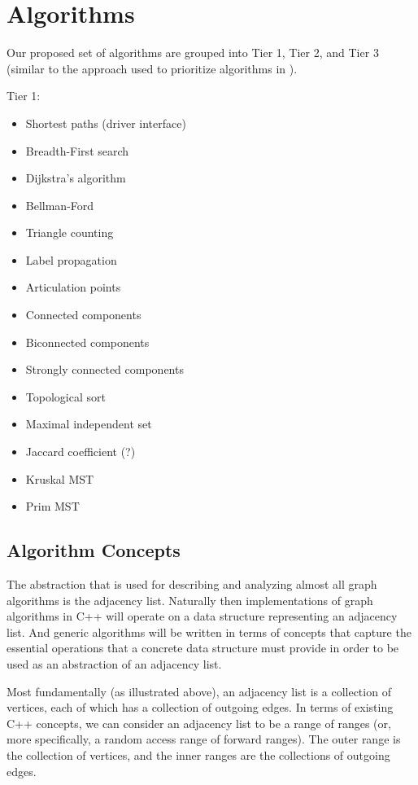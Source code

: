 \chapter{Algorithms}

Our proposed set of algorithms are grouped into Tier 1, Tier 2, and Tier 3 (similar to the approach used to prioritize algorithms in ).

Tier 1:
\begin{itemize}
\item Shortest paths (driver interface)
\item Breadth-First search
\item Dijkstra's algorithm
\item Bellman-Ford
\item Triangle counting
\item Label propagation
\item Articulation points
\item Connected components
\item Biconnected components
\item Strongly connected components  
\item Topological sort
\item Maximal independent set
\item Jaccard coefficient (?)
\item Kruskal MST
\item Prim MST
\end{itemize}

\section{Algorithm Concepts}


The abstraction that is used for describing and analyzing almost all graph algorithms is the adjacency list.  Naturally then implementations of graph algorithms in C++ will operate on a data structure representing an adjacency list.  And generic algorithms will be written in terms of concepts that capture the essential operations that a concrete data structure must provide in order to be used as an abstraction of an adjacency list.

Most fundamentally (as illustrated above), an adjacency list is a collection of vertices, each of which has a collection of outgoing edges.  In terms of existing C++ concepts, we can consider an adjacency list to be a range of ranges (or, more specifically, a random access range of forward ranges).  The outer range is the collection of vertices, and the inner ranges are the collections of outgoing edges.

